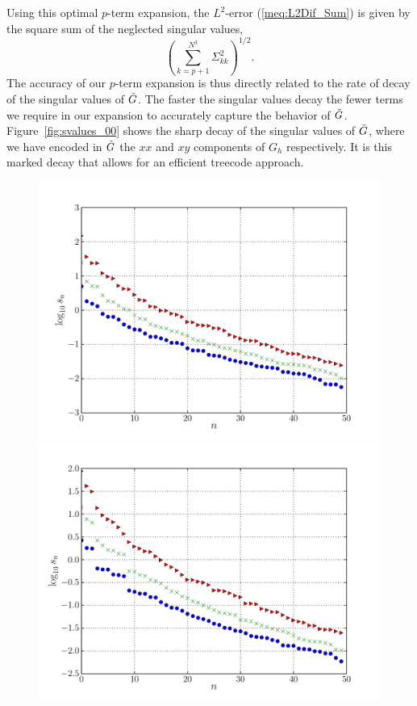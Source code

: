 Using this optimal $p$-term expansion, the $L^2$-error (\ref{meq:L2Dif_Sum}) is given by the square sum of the neglected singular values,
\begin{equation}
\left( \sum_{k=p+1}^{N^3}\Sigma_{kk}^2 \right)^{1/2}.
\end{equation}
The accuracy of our $p$-term expansion is thus directly related to the rate of decay of the singular values of $\tilde{G}$. The faster the singular values decay the fewer terms we require in our expansion  to accurately capture the behavior of $\tilde{G}$. Figure~\ref{fig:svalues_00} shows the sharp decay of the singular values of $\tilde{G}$, where we have encoded in $\tilde{G}$ the $xx$ and $xy$ components of $G_h$ respectively. It is this marked decay that allows for an efficient treecode approach.
\begin{figure}[htb]
	\begin{center}
		\includegraphics[bb=0in 0in 7.7in 6.3in,width=\StandardFigureWidth,clip]{Images_Methodology/svalues_00.pdf}
	\end{center}
	\begin{center}
		\includegraphics[bb=0in 0in 7.7in 6.3in,width=\StandardFigureWidth,clip]{Images_Methodology/svalues_01.pdf}

\end{center}
\end{figure}

